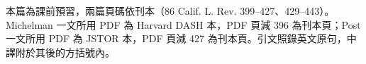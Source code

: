 本篇為課前預習，兩篇頁碼依刊本（86 Calif. L. Rev. 399--427、429--443）。Michelman 一文所用 PDF 為 Harvard DASH 本，PDF 頁減 396 為刊本頁；Post 一文所用 PDF 為 JSTOR 本，PDF 頁減 427 為刊本頁。引文照錄英文原句，中譯附於其後的方括號內。
